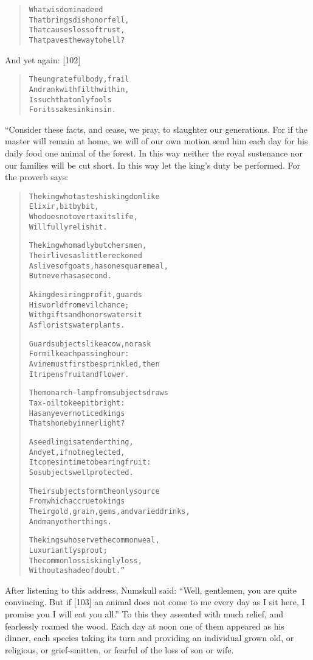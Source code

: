 \documentclass[article, twoside, 14pt]{memoir}
\renewenvironment{verbatim}{%
\begin{quote}%
\vskip -10pt%
\begin{alltt}\normalfont\large}{\end{alltt}%
\end{quote}%
\vskip -10pt
} %
\begin{document}
\begin{verbatim}
What wisdom in a deed
    That brings dishonor fell,
That causes loss of trust,
    That paves the way to hell?
\end{verbatim}
And yet again: [102]

\begin{verbatim}
The ungrateful body, frail
    And rank with filth within,
Is such that only fools
    For its sake sink in sin.
\end{verbatim}
“Consider these facts, and cease, we pray, to slaughter our
generations. For if the master will remain at home, we will of our
own motion send him each day for his daily food one animal of the
forest. In this way neither the royal sustenance nor our families
will be cut short. In this way let the king's duty be performed.
For the proverb says:

\begin{verbatim}
The king who tastes his kingdom like
    Elixir, bit by bit,
Who does not overtax its life,
Will fully relish it.

The king who madly butchers men,
    Their lives as little reckoned
As lives of goats, has one square meal,
    But never has a second.

A king desiring profit, guards
    His world from evil chance;
With gifts and honors waters it
    As florists water plants.

Guard subjects like a cow, nor ask
    For milk each passing hour:
A vine must first be sprinkled, then
    It ripens fruit and flower.

The monarch-lamp from subjects draws
    Tax-oil to keep it bright:
Has any ever noticed kings
    That shone by inner light?

A seedling is a tender thing,
    And yet, if not neglected,
It comes in time to bearing fruit:
    So subjects well protected.

Their subjects form the only source
    From which accrue to kings
Their gold, grain, gems, and varied drinks,
    And many other things.

The kings who serve the common weal,
    Luxuriantly sprout;
The common loss is kingly loss,
    Without a shade of doubt.”
\end{verbatim}
After listening to this address, Numskull said:
``Well, gentlemen, you are quite convincing. But if [103] an animal does not come to me every day as I sit here, I promise you I will eat you all.''
To this they assented with much relief, and fearlessly roamed the
wood. Each day at noon one of them appeared as his dinner, each
species taking its turn and providing an individual grown old, or
religious, or grief-smitten, or fearful of the loss of son or
wife.
\end{document}
